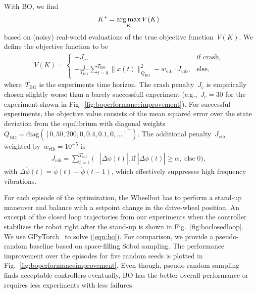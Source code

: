 With BO, we find
\begin{align}\label{eqn:bo}
K^* = \operatorname*{arg\,max}_{K} V(K)
\end{align}
based on (noisy) real-world evaluations of the true objective function~$V(K)$.
We define the objective function to be
\begin{align}
    \label{eqn:bo:cost}
    V(K) = 
        \begin{cases}
        -J_\text{c}, & \text{if crash}, \\
        -\frac{1}{T_\text{BO}}\sum_{t=0}^{T_\text{BO}} \|x(t)\|_{Q_\text{BO}}^2 - w_\text{vib}\cdot J_{\text{vib}}, & \text{else},
        \end{cases}
\end{align}
where~$T_\text{BO}$ is the experiments time horizon. The crash penalty~$J_\text{c}$ is empirically chosen slightly worse than a barely successfull experiment (e.g.,~$J_\text{c}=30$ for the experiment shown in Fig.~\ref{fig:boperformanceimprovement}).
For successful experiments, the objective value consists of the mean squared error over the state deviation from the equilibrium with diagonal weights~$Q_\text{BO}=\text{diag}([0,50,200,0,0.4,0.1,0,\dots]^\top)$.
The additional penalty~$J_\text{vib}$ weighted by~$w_\text{vib}=10^{-5}$ is
\begin{align}
    \label{eqn:bo:costvib}
    J_{vib} 
    = \sum_{t=1}^{T_\text{BO}} 
    ( 
        &|\Delta\dot{\phi}(t)|,
        \text{if}\; |\Delta\dot{\phi}(t)| \geq \alpha, \;
        \text{else}\; 0
    ),
\end{align}
with $\Delta\dot{\phi}(t)=\dot{\phi}(t)-\dot{\phi}(t-1)$, which effectively suppresses high frequency vibrations.

For each episode of the optimization, the Wheelbot has to perform a stand-up maneuver and balance with a setpoint change in the drive-wheel position.
An excerpt of the closed loop trajectories from our experiments when the controller stabilizes the robot right after the stand-up is shown in Fig.~\ref{fig:boclosedloop}.
We use GPyTorch~\cite{gardner2018gpytorch} to solve (\ref{eqn:bo}).
For comparison, we provide a pseudo-random baseline based on space-filling Sobol sampling.
The performance improvement over the episodes for five random seeds is plotted in Fig.~\ref{fig:boperformanceimprovement}.
Even though, pseudo random sampling finds acceptable controllers eventually, BO has the better overall performance or requires less experiments with less failures.

